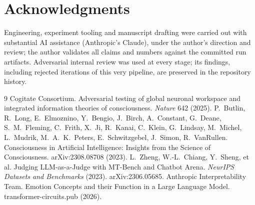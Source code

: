 \documentclass[11pt]{article}
\begin{document}
\section*{Acknowledgments}
Engineering, experiment tooling and manuscript drafting were carried out with substantial AI assistance (Anthropic's Claude), under the author's direction and review; the author validates all claims and numbers against the committed run artifacts. Adversarial internal review was used at every stage; its findings, including rejected iterations of this very pipeline, are preserved in the repository history.

\begin{thebibliography}{9}
 Cogitate Consortium. Adversarial testing of global neuronal workspace and integrated information theories of consciousness. \emph{Nature} 642 (2025).
 P.~Butlin, R.~Long, E.~Elmoznino, Y.~Bengio, J.~Birch, A.~Constant, G.~Deane, S.~M.~Fleming, C.~Frith, X.~Ji, R.~Kanai, C.~Klein, G.~Lindsay, M.~Michel, L.~Mudrik, M.~A.~K.~Peters, E.~Schwitzgebel, J.~Simon, R.~VanRullen. Consciousness in Artificial Intelligence: Insights from the Science of Consciousness. arXiv:2308.08708 (2023).
 L.~Zheng, W.-L.~Chiang, Y.~Sheng, et al. Judging LLM-as-a-Judge with MT-Bench and Chatbot Arena. \emph{NeurIPS Datasets and Benchmarks} (2023). arXiv:2306.05685.
 Anthropic Interpretability Team. Emotion Concepts and their Function in a Large Language Model. transformer-circuits.pub (2026).
\end{thebibliography}
\end{document}
